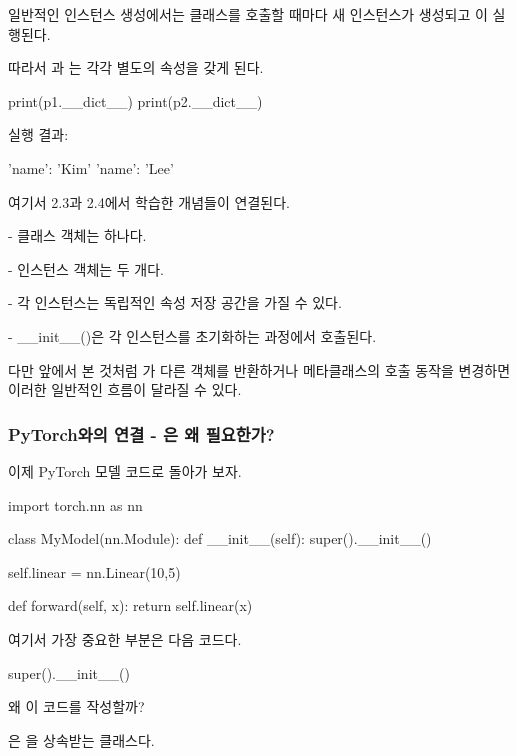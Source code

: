 일반적인 인스턴스 생성에서는 클래스를 호출할 때마다 새 인스턴스가 생성되고 이 실행된다.

따라서 과 는 각각 별도의 속성을 갖게 된다.

\begin{dhkcode}
print(p1.__dict__)
print(p2.__dict__)
\end{dhkcode}

실행 결과:

\begin{dhkzsh}
{'name': 'Kim'}
{'name': 'Lee'}
\end{dhkzsh}

여기서 2.3과 2.4에서 학습한 개념들이 연결된다.

\begin{dhksmry}
    - 클래스 객체는 하나다.

    - 인스턴스 객체는 두 개다.

    - 각 인스턴스는 독립적인 속성 저장 공간을 가질 수 있다.

    - __init__()은 각 인스턴스를 초기화하는 과정에서 호출된다.
\end{dhksmry}

다만 앞에서 본 것처럼 가 다른 객체를 반환하거나 메타클래스의 호출 동작을 변경하면 이러한 일반적인 흐름이 달라질 수 있다.

\subsubsection{PyTorch와의 연결 - 은 왜 필요한가?}

이제 PyTorch 모델 코드로 돌아가 보자.

\begin{dhkcode}
import torch.nn as nn

class MyModel(nn.Module):
    def __init__(self):
        super().__init__()

        self.linear = nn.Linear(10,5)

    def forward(self, x):
        return self.linear(x)
\end{dhkcode}

여기서 가장 중요한 부분은 다음 코드다.

\begin{dhkcode}
super().__init__()
\end{dhkcode}

왜 이 코드를 작성할까?

은 을 상속받는 클래스다.

